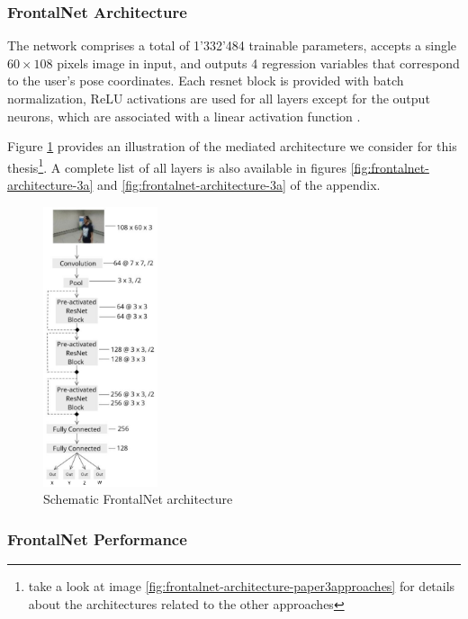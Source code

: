 \subsubsection{FrontalNet Architecture}
\label{subsec:frontalnet-architecture}

The network comprises a total of 1'332'484 trainable parameters, accepts a single $60 \times 108$ pixels image in input, and outputs 4 regression variables that correspond to the user's pose coordinates. Each \gls{resnet} block is provided with batch normalization, ReLU activations \cite{act-relu} are used for all layers except for the output neurons, which are associated with a linear activation function \cite{act-linear}. 

Figure \ref{fig:frontalnet-architecture-1} provides an illustration of the mediated architecture we consider for this thesis\footnote{take a look at image \ref{fig:frontalnet-architecture-paper3approaches} for details about the architectures related to the other approaches}. A complete list of all layers is also available in figures \ref{fig:frontalnet-architecture-3a} and \ref{fig:frontalnet-architecture-3a} of the appendix. 

\begin{figure}[!h]
	\centering
	\includegraphics[width=0.3\textwidth]{"contents/images/03-frontalnet-1A"}
	\caption[Schematic FrontalNet architecture]{Schematic FrontalNet architecture \cite{mantegazza2019visionbased}}
	\label{fig:frontalnet-architecture-1}
\end{figure}


\subsubsection{FrontalNet Performance}
\label{subsec:frontalnet-performance}

